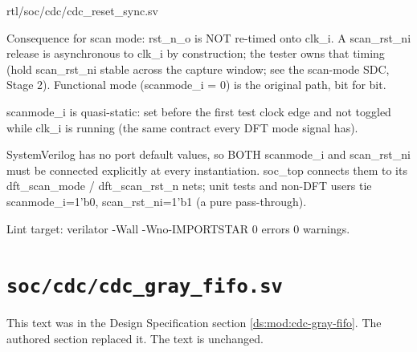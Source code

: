 \begin{relocated}{rtl/soc/cdc/cdc_reset_sync.sv}
\begin{textblock}
Consequence for scan mode: rst_n_o is NOT re-timed onto clk_i. A scan_rst_ni
release is asynchronous to clk_i by construction; the tester owns that timing
(hold scan_rst_ni stable across the capture window; see the scan-mode SDC,
Stage 2). Functional mode (scanmode_i = 0) is the original path, bit for bit.

scanmode_i is quasi-static: set before the first test clock edge and not
toggled while clk_i is running (the same contract every DFT mode signal has).

SystemVerilog has no port default values, so BOTH scanmode_i and
scan_rst_ni must be connected explicitly at every instantiation. soc_top
connects them to its dft_scan_mode / dft_scan_rst_n nets; unit tests and
non-DFT users tie scanmode_i=1'b0, scan_rst_ni=1'b1 (a pure pass-through).

Lint target: verilator -Wall -Wno-IMPORTSTAR 0 errors 0 warnings.
\end{textblock}

\end{relocated}

\section{\texttt{soc/cdc/cdc\_gray\_fifo.sv}}\label{cr:arc:ds-cdc-gray-fifo}

This text was in the Design Specification section \cref{ds:mod:cdc-gray-fifo}. The authored section replaced it. The text is unchanged.

